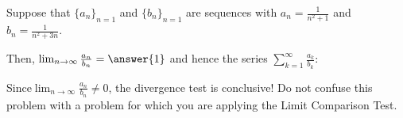 \documentclass{ximera}
\author{Jim Talamo}
\begin{document}
\begin{exercise}
Suppose that $\{a_n\}_{n=1}$ and $\{b_n\}_{n=1}$ are sequences with $a_n = \frac{1}{n^2+1}$ and $b_n = \frac{1}{n^2+3n}$.  

Then, $\lim_{n \to \infty} \frac{a_n}{b_n} = \answer{1}$ and hence the series $\sum_{k=1}^{\infty} \frac{a_k}{b_k}$:

\begin{multipleChoice}
\end{multipleChoice}

\begin{hint}
Since$ \lim_{n \to \infty} \frac{a_n}{b_n} \neq 0$, the divergence test is conclusive!  Do not confuse this problem with a problem for which you are applying the Limit Comparison Test.
\end{hint}
\end{exercise}
\end{document}

